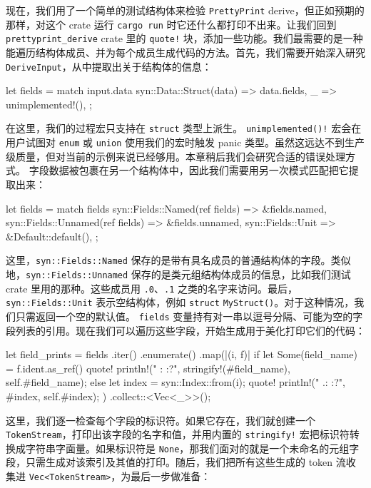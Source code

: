 现在，我们用了一个简单的测试结构体来检验 \texttt{PrettyPrint} derive，但正如预期的那样，对这个 crate 运行 \texttt{cargo run} 时它还什么都打印不出来。让我们回到 \texttt{prettyprint\_\allowbreak{}derive} crate 里的 \texttt{quote!} 块，添加一些功能。我们最需要的是一种能遍历结构体成员、并为每个成员生成代码的方法。首先，我们需要开始深入研究 \texttt{DeriveInput}，从中提取出关于结构体的信息：
\begin{codebox}[rust]
let fields = match input.data {
    syn::Data::Struct(data) => data.fields,
    _ => unimplemented!(),
};
\end{codebox}
\label{idx:idx_07194ab8}
在这里，我们的过程宏只支持在 \texttt{struct} 类型上派生。
\texttt{unimplemented(\allowbreak{})\allowbreak{}!} 宏会在用户试图对 \texttt{enum} 或 \texttt{union} 使用我们的宏时触发 panic
类型。虽然这远达不到生产级质量，但对当前的示例来说已经够用。本章稍后我们会研究合适的错误处理方式。
字段数据被包裹在另一个结构体中，因此我们需要用另一次模式匹配把它提取出来：
\begin{codebox}[rust]
let fields = match fields {
    syn::Fields::Named(ref fields) => &fields.named,
    syn::Fields::Unnamed(ref fields) => &fields.unnamed,
    syn::Fields::Unit => &Default::default(),
};
\end{codebox}
这里，\texttt{syn::\allowbreak{}Fields::\allowbreak{}Named} 保存的是带有具名成员的普通结构体的字段。类似地，\texttt{syn::\allowbreak{}Fields::\allowbreak{}Unnamed} 保存的是类元组结构体成员的信息，比如我们测试 crate 里用的那种。这些成员用 \texttt{.0}、\texttt{.1} 之类的名字来访问。最后，\texttt{syn::\allowbreak{}Fields::\allowbreak{}Unit} 表示空结构体，例如 \texttt{struct}
\texttt{MyStruct()}。对于这种情况，我们只需返回一个空的默认值。
\texttt{fields} 变量持有对一串以逗号分隔、可能为空的字段列表的引用。现在我们可以遍历这些字段，开始生成用于美化打印它们的代码：
\begin{codebox}[rust]
let field_prints = fields
    .iter()
    .enumerate()
    .map(|(i, f)| {
        if let Some(field_name) = f.ident.as_ref() {
            quote! {
                println!(" {}: {:?}", stringify!(#field_name), self.#field_name);
            }
        } else {
            let index = syn::Index::from(i);
            quote! {
                println!(" .{}: {:?}", #index, self.#index);
            }
        }
    })
    .collect::<Vec<_>>();
\end{codebox}
\label{idx:idx_04102514}
这里，我们逐一检查每个字段的标识符。如果它存在，我们就创建一个 \texttt{TokenStream}，打印出该字段的名字和值，并用内置的 \texttt{stringify!} 宏把标识符转换成字符串字面量。如果标识符是 \texttt{None}，那我们面对的就是一个未命名的元组字段，只需生成对该索引及其值的打印。随后，我们把所有这些生成的 token 流收集进 \texttt{Vec<\allowbreak{}TokenStream>\allowbreak{}}，为最后一步做准备：
